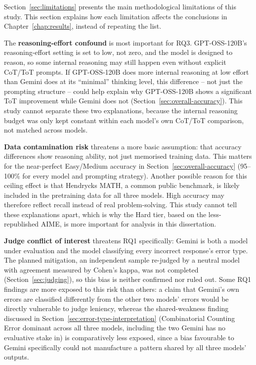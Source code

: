 Section~\ref{sec:limitations} presents the main methodological
limitations of this study. This section explains how each limitation
affects the conclusions in Chapter~\ref{chap:results}, instead of
repeating the list.

The \textbf{reasoning-effort confound} is most important for RQ3.
GPT-OSS-120B's reasoning-effort setting is set to low, not zero, and the
model is designed to reason, so some internal reasoning may still happen
even without explicit CoT/ToT prompts. If GPT-OSS-120B does more internal
reasoning at low effort than Gemini does at its ``minimal'' thinking
level, this difference -- not just the prompting structure -- could help
explain why GPT-OSS-120B shows a significant ToT improvement while
Gemini does not (Section~\ref{sec:overall-accuracy}). This study cannot
separate these two explanations, because the internal reasoning budget
was only kept constant within each model's own CoT/ToT comparison, not
matched across models.

\textbf{Data contamination risk} threatens a more basic assumption: that
accuracy differences show reasoning ability, not just memorised training
data. This matters for the near-perfect Easy/Medium accuracy in
Section~\ref{sec:overall-accuracy} (95--100\% for every model and
prompting strategy). Another possible reason for this ceiling effect is
that Hendrycks MATH, a common public benchmark, is likely included in
the pretraining data for all three models. High accuracy may therefore
reflect recall instead of real problem-solving. This study cannot tell
these explanations apart, which is why the Hard tier, based on the
less-republished AIME, is more important for analysis in this
dissertation.

\textbf{Judge conflict of interest} threatens RQ1 specifically: Gemini
is both a model under evaluation and the model classifying every
incorrect response's error type. The planned mitigation, an independent
sample re-judged by a neutral model with agreement measured by Cohen's
kappa, was not completed (Section~\ref{sec:judging}), so this bias is
neither confirmed nor ruled out. Some RQ1 findings are more exposed to
this risk than others: a claim that Gemini's own errors are classified
differently from the other two models' errors would be directly
vulnerable to judge leniency, whereas the shared-weakness finding
discussed in Section~\ref{sec:error-type-interpretation} (Combinatorial Counting Error
dominant across all three models, including the two Gemini has no
evaluative stake in) is comparatively less exposed, since a bias
favourable to Gemini specifically could not manufacture a pattern shared
by all three models' outputs.

